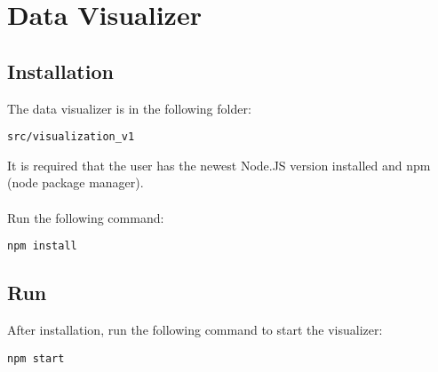 \documentclass{article}
\begin{document}
\section{Data Visualizer}\subsection{Installation}
The data visualizer is in the following folder:
\begin{lstlisting}
src/visualization_v1
\end{lstlisting}
It is required that the user has the newest Node.JS version installed and npm (node package manager).
\\\\
Run the following command:
\begin{lstlisting}
npm install
\end{lstlisting}
\subsection{Run}
After installation, run the following command to start the visualizer:
\begin{lstlisting}
npm start
\end{lstlisting}
\end{document}
